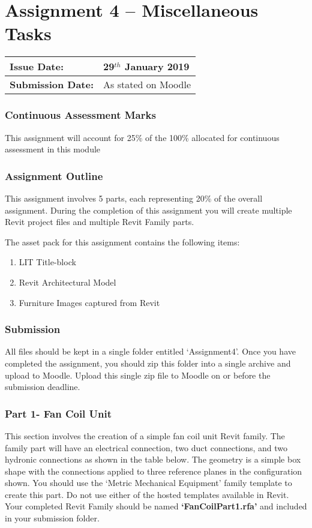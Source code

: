 
	
\part*{Assignment 4 – Miscellaneous Tasks}

\begin{tabularx}{\textwidth}{ |X|X| }
	\hline
	\textbf{Issue Date:} & 29$^{th}$ January 2019 \\
	\hline 
	\textbf{Submission Date:}  & As stated on Moodle  \\
	\hline
\end{tabularx}

\section*{Continuous Assessment Marks}
This assignment will account for 25\% of the 100\% allocated for continuous assessment in this module

\section*{Assignment Outline}
This assignment involves 5 parts, each representing 20\% of the overall assignment. During the completion of this assignment you will create multiple Revit project files and multiple Revit Family parts.


The asset pack for this assignment contains the following items:
\begin{enumerate}
	\item LIT Title-block
	\item Revit Architectural Model
	\item Furniture Images captured from Revit
\end{enumerate}


\section*{Submission}
All files should be kept in a single folder entitled ‘Assignment4’. Once you have completed the assignment, you should zip this folder into a single archive and upload to Moodle. Upload this single zip file to Moodle on or before the submission deadline.


\newpage

\section*{Part 1- Fan Coil Unit}
This section involves the creation of a simple fan coil unit Revit family. The family part will have an electrical connection, two duct connections, and two hydronic connections as shown in the table below. The geometry is a simple box shape with the connections applied to three reference planes in the configuration shown. You should use the ‘Metric Mechanical Equipment’ family template to create this part. Do not use either of the hosted templates available in Revit.  Your completed Revit Family should be named \textbf{‘FanCoilPart1.rfa’} and included in your submission folder.\\

